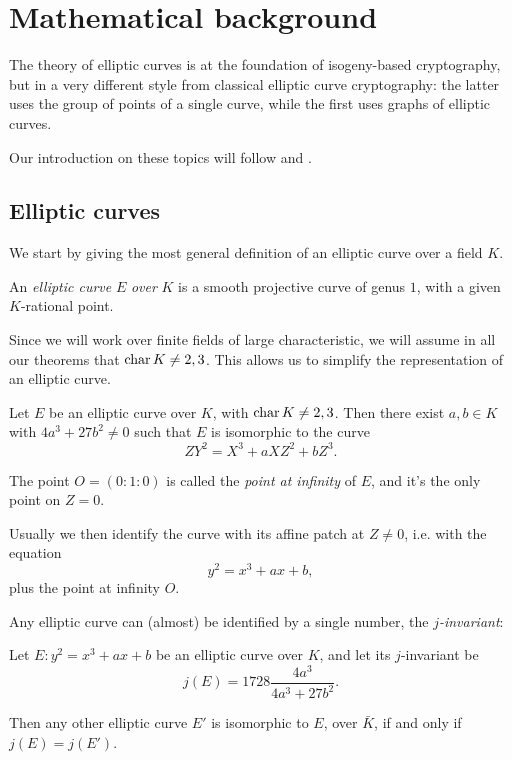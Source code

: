 \chapter{Mathematical background}

The theory of elliptic curves is at the foundation of isogeny-based cryptography, but in a very different style from classical elliptic curve cryptography: the latter uses the group of points of a single curve, while the first uses graphs of elliptic curves.

Our introduction on these topics will follow \cite{Silverman} and \cite{DeFeo_intro}.

\section{Elliptic curves}

We start by giving the most general definition of an elliptic curve over a field $K$.

\begin{definition}
    An \emph{elliptic curve} $E$ \emph{over} $K$ is a smooth projective curve of genus $1$, with a given $K$-rational point.
\end{definition}

Since we will work over finite fields of large characteristic, we will assume in all our theorems that $\operatorname{char} K\neq 2,3$. This allows us to simplify the representation of an elliptic curve.

\begin{proposition}
    Let $E$ be an elliptic curve over $K$, with $\operatorname{char} K\neq 2,3$. Then there exist $a,b\in K$ with $4a^3+27b^2\neq0$ such that $E$ is isomorphic to the curve $$ZY^2=X^3+aXZ^2+bZ^3.$$
    
    The point $O=(0:1:0)$ is called the \emph{point at infinity} of $E$, and it's the only point on $Z=0$.
\end{proposition}

Usually we then identify the curve with its affine patch at $Z\neq0$, i.e. with the equation $$y^2=x^3+ax+b,$$
plus the point at infinity $O$.

Any elliptic curve can (almost) be identified by a single number, the \emph{$j$-invariant}:
\begin{theorem}
    Let $E:y^2=x^3+ax+b$ be an elliptic curve over $K$, and let its $j$-invariant be $$j(E)=1728\frac{4a^3}{4a^3+27b^2}.$$
    
    Then any other elliptic curve $E'$ is isomorphic to $E$, over $\bar K$, if and only if $j(E)=j(E')$.
\end{theorem}

